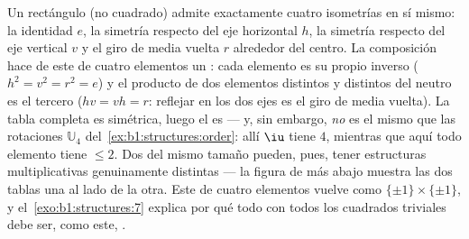 \begin{example}\label{ex:b1:structures:klein}
Un rectángulo (no cuadrado) admite exactamente cuatro isometrías en sí
mismo: la identidad $e$, la simetría respecto del eje horizontal $h$, la
simetría respecto del eje vertical $v$ y el giro de media vuelta $r$
alrededor del centro. La composición hace de este  de cuatro
elementos un : cada elemento es su propio inverso
($h^2 = v^2 = r^2 = e$) y el producto de dos elementos distintos y
distintos del neutro es el tercero ($hv = vh = r$: reflejar en los dos
ejes es el giro de media vuelta). La tabla completa es simétrica, luego
el  es  --- y, sin embargo, \emph{no} es el mismo
 que las rotaciones $\mathbb U_4$
del~\cref{ex:b1:structures:order}: allí $\iu$ tiene  $4$, mientras
que aquí todo elemento tiene  $\leq 2$. Dos  del mismo
tamaño pueden, pues, tener estructuras multiplicativas genuinamente
distintas --- la figura de más abajo muestra las dos tablas una al lado
de la otra. Este  de cuatro elementos vuelve como
$\{\pm1\} \times \{\pm1\}$, y el~\cref{exo:b1:structures:7} explica por
qué todo  con todos los cuadrados triviales debe ser, como este,
.
\end{example}

